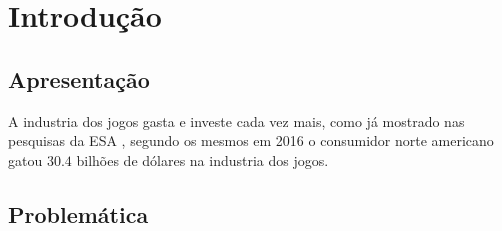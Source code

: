 \chapter{Introdução}

\section{Apresentação}
A industria dos jogos gasta e investe cada vez mais, como já mostrado nas
pesquisas da ESA \cite{entertainment2017essential}, segundo os mesmos em 2016 o
consumidor norte americano gatou $30.4$ bilhões de dólares na industria dos
jogos.

\section{Problemática}







